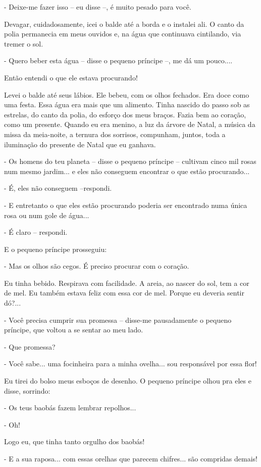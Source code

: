 - Deixe-me fazer isso -- eu disse --, é muito pesado para você.

Devagar, cuidadosamente, icei o balde até a borda e o instalei ali. O
canto da polia permanecia em meus ouvidos e, na água que continuava
cintilando, via tremer o sol.

- Quero beber esta água -- disse o pequeno príncipe --, me dá um
pouco....

Então entendi o que ele estava procurando!

Levei o balde até seus lábios. Ele bebeu, com os olhos fechados. Era
doce como uma festa. Essa água era mais que um alimento. Tinha nascido
do passo sob as estrelas, do canto da polia, do esforço dos meus braços.
Fazia bem ao coração, como um presente. Quando eu era menino, a luz da
árvore de Natal, a música da missa da meia-noite, a ternura dos
sorrisos, compunham, juntos, toda a iluminação do presente de Natal que
eu ganhava.

- Os homens do teu planeta -- disse o pequeno príncipe -- cultivam cinco
mil rosas num mesmo jardim... e eles não conseguem encontrar o que estão
procurando...

- É, eles não conseguem --respondi.

- E entretanto o que eles estão procurando poderia ser encontrado numa
única rosa ou num gole de água...

- É claro -- respondi.

E o pequeno príncipe prosseguiu:

- Mas os olhos são cegos. É preciso procurar com o coração.

Eu tinha bebido. Respirava com facilidade. A areia, ao nascer do sol,
tem a cor de mel. Eu também estava feliz com essa cor de mel. Porque eu
deveria sentir dó?...

- Você precisa cumprir sua promessa -- disse-me pausadamente o pequeno
príncipe, que voltou a se sentar ao meu lado.

- Que promessa?

- Você sabe... uma focinheira para a minha ovelha... sou responsável por
essa flor!

Eu tirei do bolso meus esboços de desenho. O pequeno príncipe olhou pra
eles e disse, sorrindo:

- Os teus baobás fazem lembrar repolhos...

- Oh!

Logo eu, que tinha tanto orgulho dos baobás!

- E a sua raposa... com essas orelhas que parecem chifres... são
compridas demais!

